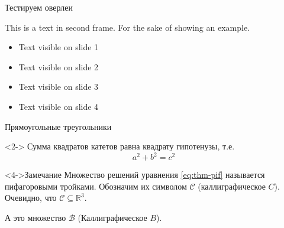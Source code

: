 \documentclass[aspectratio=169, 12pt]{beamer}
\begin{document}
\begin{frame}[label={sec:org0f83ba0}]{Тестируем оверлеи}

    This is a text in second frame.  For the sake of showing an example.

    \begin{itemize}[<+->]
        \item Text visible on slide 1
        \item Text visible on slide 2
        \item Text visible on slide 3
        \item Text visible on slide 4
    \end{itemize}
\end{frame}
\begin{frame}[label={sec:orgc1bad94}]{Прямоугольные треугольники}

    \begin{theorem}
        <2->
        Сумма квадратов катетов равна квадрату гипотенузы, т.е.
        \begin{equation}
            \label{eq:thm-pif}
            a^2 + b^2 = c^2
        \end{equation}
    \end{theorem}

    \begin{alertblock}<4->{Замечание}
        Множество решений уравнения \eqref{eq:thm-pif} называется пифагоровыми тройками.
        Обозначим их символом \(\mathcal{C}\) (каллиграфическое \(C\)).
        Очевидно, что \(\mathcal{C}\subseteq \mathbb{R}^{3}\).

        А это множество \(\mathcal{B}\) (Каллиграфическое \(B\)).
    \end{alertblock}
\end{frame}
\end{document}
